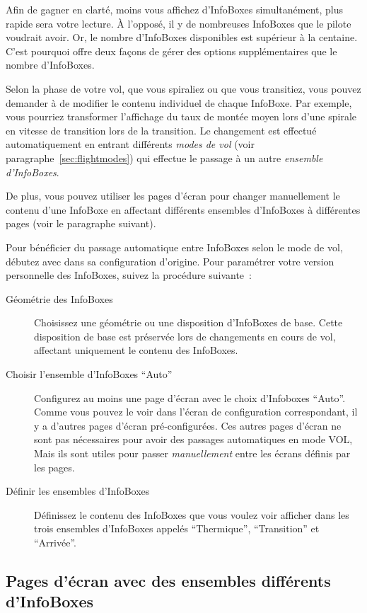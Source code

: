 Afin de gagner en clarté, moins vous affichez d'InfoBoxes simultanément,
plus rapide sera votre lecture. À l'opposé, il y de nombreuses InfoBoxes
que le pilote voudrait avoir. Or, le nombre d'InfoBoxes disponibles
est supérieur à la centaine. C'est pourquoi \xc{} offre deux façons de 
gérer des options supplémentaires que le nombre d'InfoBoxes.

Selon la phase de votre vol, que vous spiraliez ou que vous transitiez, vous pouvez
demander à \xc{} de modifier le contenu individuel de chaque InfoBoxe. Par exemple, vous pourriez
transformer l'affichage du taux de montée moyen lors d'une spirale en vitesse de transition
lors de la transition. Le changement est effectué automatiquement en entrant différents 
\emph{modes de vol} (voir paragraphe~\ref{sec:flightmodes}) qui effectue le passage à
un autre \emph{ensemble d'InfoBoxes}.

De plus, vous pouvez utiliser les pages d'écran pour changer manuellement le contenu d'une InfoBoxe en
affectant différents ensembles d'InfoBoxes à différentes pages (voir le paragraphe suivant).

Pour bénéficier du passage automatique entre InfoBoxes selon le mode de vol,
débutez avec \xc{} dans sa configuration d'origine. Pour paramétrer
votre version personnelle des InfoBoxes, suivez la procédure suivante~:
\begin{description}
\item[Géométrie des InfoBoxes] Choisissez une géométrie ou une disposition d'InfoBoxes de base. Cette
disposition de base est préservée lors de changements en cours de vol, affectant uniquement
le contenu des InfoBoxes.
\item[Choisir l'ensemble d'InfoBoxes ``Auto''] Configurez au moins une page d'écran avec le
choix d'Infoboxes ``Auto''. Comme vous pouvez le voir dans l'écran de configuration
correspondant, il y a d'autres pages d'écran pré-configurées.  Ces
autres pages d'écran ne sont pas nécessaires pour avoir des passages automatiques en mode VOL,
Mais ils sont utiles pour passer \emph{manuellement} entre les écrans définis par les pages.
\item[Définir les ensembles d'InfoBoxes] Définissez le contenu des InfoBoxes que vous voulez
voir afficher dans les trois ensembles d'InfoBoxes appelés ``Thermique'', ``Transition'' et ``Arrivée''.
\end{description}  


\subsection*{Pages d'écran avec des ensembles différents d'InfoBoxes}\label{sec:screenpages}

